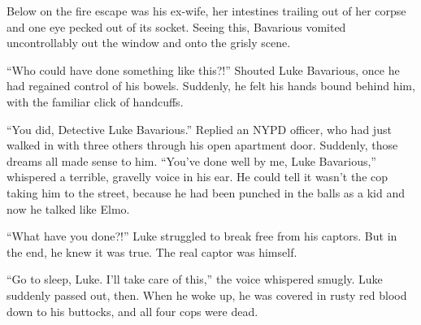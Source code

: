 Below on the fire escape was his ex-wife, her intestines trailing
out of her corpse and one eye pecked out of its socket. Seeing
this, Bavarious vomited uncontrollably out the window and onto the
grisly scene.



``Who could have done something like this?!'' Shouted Luke Bavarious,
once he had regained control of his bowels. Suddenly, he felt his
hands bound behind him, with the familiar click of handcuffs.



``You did, Detective Luke Bavarious.'' Replied an NYPD officer, who
had just walked in with three others through his open apartment
door. Suddenly, those dreams all made sense to him. ``You've done
well by me, Luke Bavarious,'' whispered a terrible, gravelly voice
in his ear. He could tell it wasn't the cop taking him to the
street, because he had been punched in the balls as a kid and now
he talked like Elmo.



``What have you done?!'' Luke struggled to break free from his
captors. But in the end, he knew it was true. The real captor was
himself.



``Go to sleep, Luke. I'll take care of this,'' the voice whispered
smugly. Luke suddenly passed out, then. When he woke up, he was
covered in rusty red blood down to his buttocks, and all four cops
were dead. 
 



